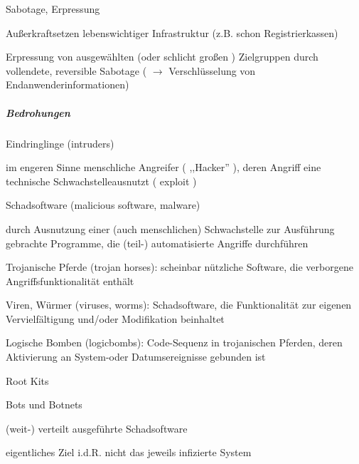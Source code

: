 \documentclass[a4paper]{article}
\begin{document}
\begin{multicols}{3}
    \begin{enumerate*}
        \setcounter{enumi}{4}
        \item
        Sabotage, Erpressung
    \end{enumerate*}

    \begin{itemize*}
        \item
        Außerkraftsetzen lebenswichtiger Infrastruktur (z.B. schon
        Registrierkassen)
        \item
        Erpressung von ausgewählten (oder schlicht großen ) Zielgruppen durch
        vollendete, reversible Sabotage ( $\rightarrow$
        Verschlüsselung von Endanwenderinformationen)
    \end{itemize*}


    \subparagraph{Bedrohungen}

    \begin{enumerate*}
        \item
        Eindringlinge (intruders)
        \begin{itemize*}
            \item im engeren Sinne menschliche Angreifer ( ,,Hacker'' ), deren Angriff eine technische Schwachstelleausnutzt ( exploit )
        \end{itemize*}
        \item
        Schadsoftware (malicious software, malware)
        \begin{itemize*}
            \item durch Ausnutzung einer (auch menschlichen) Schwachstelle zur Ausführung gebrachte Programme, die (teil-) automatisierte Angriffe durchführen
            \item Trojanische Pferde (trojan horses): scheinbar nützliche Software, die verborgene Angriffsfunktionalität enthält
            \item Viren, Würmer (viruses, worms): Schadsoftware, die Funktionalität zur eigenen Vervielfältigung und/oder Modifikation beinhaltet
            \item Logische Bomben (logicbombs): Code-Sequenz in trojanischen Pferden, deren Aktivierung an System-oder Datumsereignisse gebunden ist
            \item Root Kits
        \end{itemize*}
        \item
        Bots und Botnets
        \begin{itemize*}
            \item (weit-) verteilt ausgeführte Schadsoftware
            \item eigentliches Ziel i.d.R. nicht das jeweils infizierte System
        \end{itemize*}
    \end{enumerate*}



\end{multicols}
\end{document}
